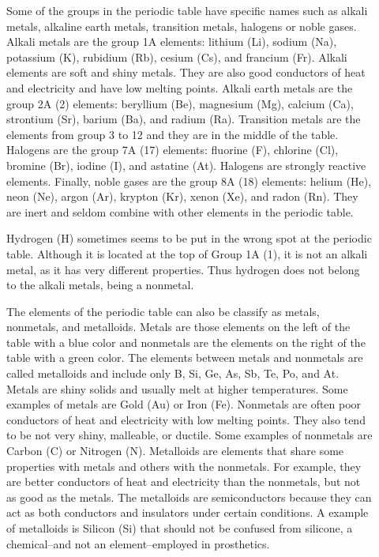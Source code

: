 \documentclass[main.tex]{subfiles}
\begin{document}
\begin{description}
\item[] Some of the groups in the periodic table have specific names such as alkali metals, alkaline earth metals, transition metals, halogens or noble gases. Alkali metals are the group 1A elements: lithium (Li), sodium (Na), potassium (K), rubidium (Rb), cesium (Cs), and francium (Fr). Alkali elements are soft and shiny metals. They are also good conductors of heat and electricity and have low melting points. Alkali earth metals are the group 2A (2) elements: beryllium (Be), magnesium (Mg), calcium (Ca), strontium (Sr), barium (Ba), and radium (Ra). Transition metals are the elements from group 3 to 12 and they are in the middle of the table. Halogens are the group 7A (17) elements: fluorine (F), chlorine (Cl), bromine (Br), iodine (I), and astatine (At). Halogens are strongly reactive elements. Finally, noble gases are the group 8A (18) elements: helium (He), neon (Ne), argon (Ar), krypton (Kr), xenon (Xe), and radon (Rn). They are  inert and seldom combine with other elements in the periodic table.
\item[] Hydrogen (H) sometimes seems to be put in the wrong spot at the periodic table. Although it is located at the top of Group 1A (1), it is not an alkali metal, as it has very different properties. Thus hydrogen does not belong to the alkali metals, being a nonmetal. 
\item[] The elements of the periodic table can also be classify as metals, nonmetals, and metalloids. Metals are those elements on the left of the table with a blue color and nonmetals are the elements on the right of the table with a green color. The elements between metals and nonmetals are called metalloids and include only B, Si, Ge, As, Sb, Te, Po, and At. Metals are shiny solids and usually melt at higher temperatures. Some examples of metals are Gold (Au) or Iron (Fe). Nonmetals are often poor conductors of heat and electricity with low melting points. They also tend to be not very shiny, malleable, or ductile. Some examples of nonmetals are Carbon (C) or Nitrogen (N). Metalloids are elements that share some properties with metals and others with the nonmetals. For example, they are better conductors of heat and electricity than the nonmetals, but not as good as the metals. The metalloids are semiconductors because they can act as both conductors and insulators under certain conditions. A example of metalloids is Silicon (Si) that should not be confused from silicone, a chemical--and not an element--employed in prosthetics.
 \end{description}
\end{document}
